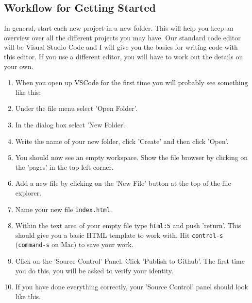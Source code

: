 \documentclass[english,11pt,a4paper]{report}
\begin{document}
\subsection{Workflow for Getting Started}
In general, start each new project in a new folder. This will help you keep an overview over all the different projects you may have. Our standard code editor will be Visual Studio Code and I will give you the basics for writing code with this editor. If you use a different editor, you will have to work out the details on your own.

\renewcommand{\labelenumi}{\arabic{enumi}.}
\begin{enumerate}
    \item When you open up VSCode for the first time you will probably see something like this:
    \item Under the file menu select 'Open Folder'.
    \item In the dialog box select 'New Folder'.
    \item Write the name of your new folder, click 'Create'  and then click 'Open'.
    \item You should now see an empty workspace. Show the file browser by clicking on the 'pages' in the top left corner. 
    \item Add a new file by clicking on the 'New File' button at the top of the file explorer.
    \newpage
    \item Name your new file \verb|index.html|.
    \item Within the text area of your empty file type \verb|html:5| and push 'return'. This should give you a basic HTML template to work with. Hit \verb|control-s| (\verb|command-s| on Mac) to save your work.
    \newpage
    \item Click on the 'Source Control' Panel. Click 'Publish to Github'. The first time you do this, you will be asked to verify your identity.
    \item If you have done everything correctly, your 'Source Control' panel should look like this.
\end{enumerate}
\end{document}
